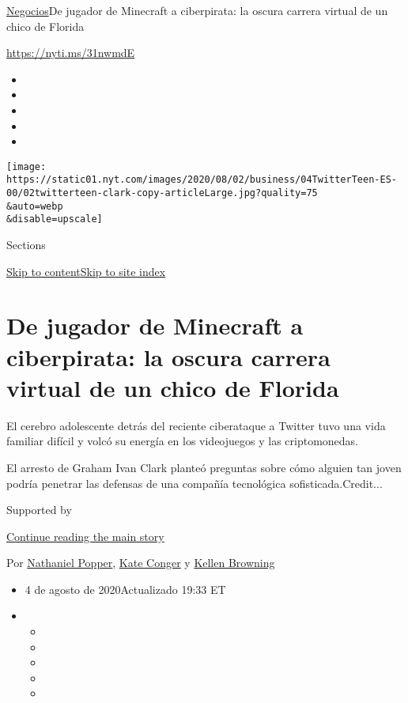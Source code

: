 \href{/es/section/negocios}{Negocios}\textbar{}De jugador de Minecraft a
ciberpirata: la oscura carrera virtual de un chico de Florida

\url{https://nyti.ms/31nwmdE}

\begin{itemize}
\item
\item
\item
\item
\item
\end{itemize}

\texttt{[image: https://static01.nyt.com/images/2020/08/02/business/04TwitterTeen-ES-00/02twitterteen-clark-copy-articleLarge.jpg?quality=75\\\&auto=webp\\\&disable=upscale]}

Sections

\protect\hyperlink{site-content}{Skip to
content}\protect\hyperlink{site-index}{Skip to site index}

\hypertarget{de-jugador-de-minecraft-a-ciberpirata-la-oscura-carrera-virtual-de-un-chico-de-florida}{%
\section{De jugador de Minecraft a ciberpirata: la oscura carrera
virtual de un chico de
Florida}\label{de-jugador-de-minecraft-a-ciberpirata-la-oscura-carrera-virtual-de-un-chico-de-florida}}

El cerebro adolescente detrás del reciente ciberataque a Twitter tuvo
una vida familiar difícil y volcó su energía en los videojuegos y las
criptomonedas.

El arresto de Graham Ivan Clark planteó preguntas sobre cómo alguien tan
joven podría penetrar las defensas de una compañía tecnológica
sofisticada.Credit...

Supported by

\protect\hyperlink{after-sponsor}{Continue reading the main story}

Por \href{https://www.nytimes.com/by/nathaniel-popper}{Nathaniel
Popper}, \href{https://www.nytimes.com/by/kate-conger}{Kate Conger} y
\href{https://www.nytimes.com/by/kellen-browning}{Kellen Browning}

\begin{itemize}
\item
  4 de agosto de 2020Actualizado 19:33 ET
\item
  \begin{itemize}
  \item
  \item
  \item
  \item
  \item
  \end{itemize}
\end{itemize}

